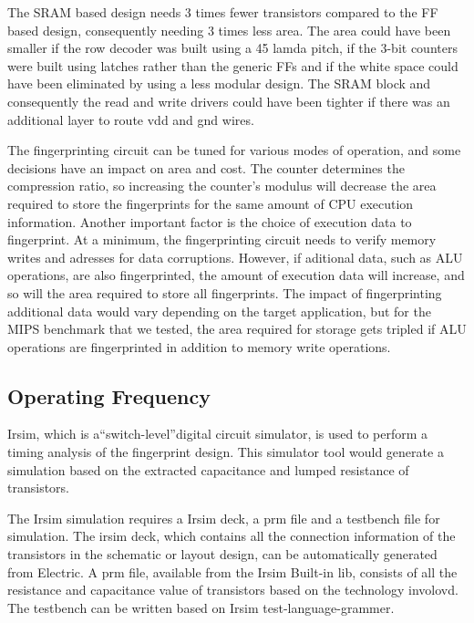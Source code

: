 \documentclass[10pt,journal,compsoc]{IEEEtran}
\begin{document}
The SRAM based design needs 3 times fewer transistors compared to the FF based design, consequently needing 3 times less area. The area could have been smaller if the row decoder was built using a 45 lamda pitch, if the 3-bit counters were built using latches rather than the generic FFs and if the white space could have been eliminated by using a less modular design. The SRAM block and consequently the read and write drivers could have been tighter if there was an additional layer to route vdd and gnd wires.	

The fingerprinting circuit can be tuned for various modes of operation, and some decisions have an impact on area and cost. The counter determines the compression ratio, so increasing the counter's modulus will decrease the area required to store the fingerprints for the same amount of CPU execution information. Another important factor is the choice of execution data to fingerprint. At a minimum, the fingerprinting circuit needs to verify memory writes and adresses for data corruptions. However, if aditional data, such as ALU operations, are also fingerprinted, the amount of execution data will increase, and so will the area required to store all fingerprints. The impact of fingerprinting additional data would vary depending on the target application, but for the MIPS benchmark that we tested, the area required for storage gets tripled if ALU operations are fingerprinted in addition to memory write operations. 

\subsection{Operating Frequency}
Irsim, which is a“switch-level”digital circuit simulator, is used to perform a timing analysis of the fingerprint design. This simulator tool would generate a simulation based on the extracted capacitance and lumped resistance of transistors.
    
    The Irsim simulation requires a Irsim deck, a prm file and a testbench file for simulation. The irsim deck, which contains all the connection information of the transistors in the schematic or layout design, can be automatically generated from Electric. A prm file, available from the Irsim Built-in lib, consists of all the resistance and capacitance value of transistors based on the technology involovd. The testbench can be written based on Irsim test-language-grammer.
    
\end{document}
